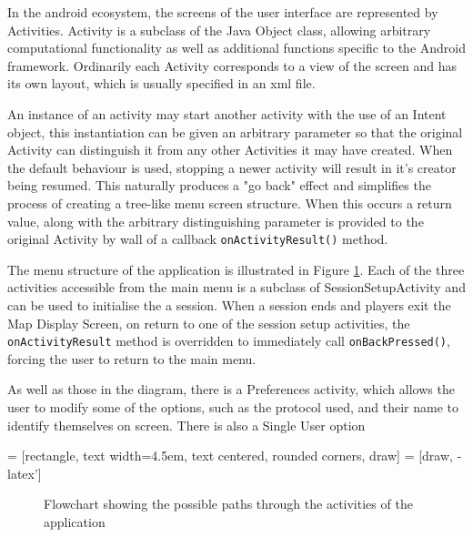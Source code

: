 In the android ecosystem, the screens of the user interface are represented by Activities. Activity is a subclass of the Java Object class, allowing arbitrary computational functionality as well as additional functions specific to the Android framework. Ordinarily each Activity corresponds to a view of the screen and has its own layout, which is usually specified in an xml file.

An instance of an activity may start another activity with the use of an Intent object, this instantiation can be given an arbitrary parameter so that the original Activity can distinguish it from any other Activities it may have created. When the default behaviour is used, stopping a newer activity will result in it's creator being resumed. This naturally produces a "go back" effect and simplifies the process of creating a tree-like menu screen structure. When this occurs a return value, along with the arbitrary distinguishing parameter is provided to the original Activity by wall of a callback {\tt onActivityResult()} method.

The menu structure of the application is illustrated in Figure \ref{fig:menu_structure}. Each of the three activities accessible from the main menu is a subclass of SessionSetupActivity and can be used to initialise the a session. When a session ends and players exit the Map Display Screen, on return to one of the session setup activities, the {\tt onActivityResult} method is overridden to immediately call {\tt onBackPressed()}, forcing the user to return to the main menu.

As well as those in the diagram, there is a Preferences activity, which allows the user to modify some of the options, such as the protocol used, and their name to identify themselves on screen. There is also a Single User option 

 = [rectangle, text width=4.5em, text centered, rounded corners, draw]
 = [draw, -latex']
\begin{figure}[ht]
\centering
{}
\caption{Flowchart showing the possible paths through the activities of the application}
\label{fig:menu_structure}
\end{figure}

